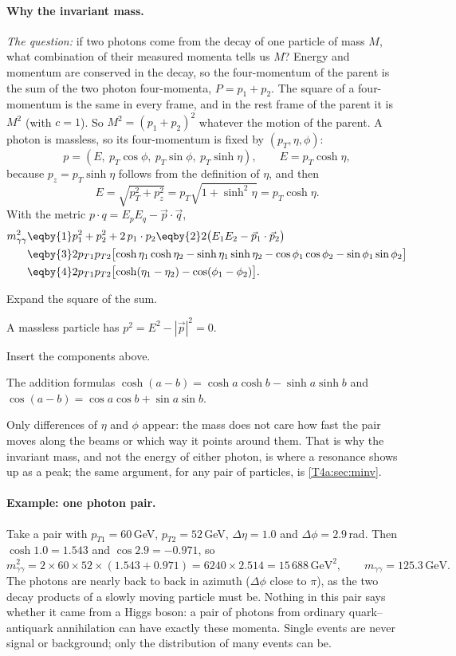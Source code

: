 \paragraph{Why the invariant mass.}
\emph{The question:} if two photons come from the decay of one particle of mass $M$, what
combination of their measured momenta tells us $M$? Energy and momentum are conserved in
the decay, so the four-momentum of the parent is the sum of the two photon four-momenta,
$P=p_1+p_2$. The square of a four-momentum is the same in every frame, and in the rest
frame of the parent it is $M^2$ (with $c=1$). So $M^2=(p_1+p_2)^2$ whatever the motion of
the parent. A photon is massless, so its four-momentum is fixed by $(p_T,\eta,\phi)$:
\[
  p=(E,\ p_T\cos\phi,\ p_T\sin\phi,\ p_T\sinh\eta),\qquad E=p_T\cosh\eta,
\]
because $p_z=p_T\sinh\eta$ follows from the definition of $\eta$, and then
\[
  E=\sqrt{p_T^2+p_z^2}=p_T\sqrt{1+\sinh^2\eta}=p_T\cosh\eta .
\]
With the metric $p\cdot q=E_pE_q-\vec p\cdot\vec q$,
\begin{align}
  m_{\gamma\gamma}^2
  &\eqby{1} p_1^2+p_2^2+2\,p_1\cdot p_2
   \eqby{2} 2\bigl(E_1E_2-\vec p_1\cdot\vec p_2\bigr)
  \nonumber\\
  &\eqby{3} 2p_{T1}p_{T2}\bigl[\cosh\eta_1\cosh\eta_2-\sinh\eta_1\sinh\eta_2
           -\cos\phi_1\cos\phi_2-\sin\phi_1\sin\phi_2\bigr]
  \nonumber\\
  &\eqby{4} 2p_{T1}p_{T2}\bigl[\cosh(\eta_1-\eta_2)-\cos(\phi_1-\phi_2)\bigr].
  \label{13d:eq:mgg}
\end{align}
\begin{explain}
  \item Expand the square of the sum.
  \item A massless particle has $p^2=E^2-|\vec p|^2=0$.
  \item Insert the components above.
  \item The addition formulas $\cosh(a-b)=\cosh a\cosh b-\sinh a\sinh b$ and
        $\cos(a-b)=\cos a\cos b+\sin a\sin b$.
\end{explain}
Only differences of $\eta$ and $\phi$ appear: the mass does not care how fast the pair
moves along the beams or which way it points around them. That is why the invariant mass,
and not the energy of either photon, is where a resonance shows up as a peak; the
same argument, for any pair of particles, is \cref{T4a:sec:minv}.

\paragraph{Example: one photon pair.}
Take a pair with $p_{T1}=60\,$GeV, $p_{T2}=52\,$GeV, $\Delta\eta=1.0$ and
$\Delta\phi=2.9\,$rad. Then $\cosh1.0=1.543$ and $\cos2.9=-0.971$, so
\[
  m_{\gamma\gamma}^2=2\times60\times52\times(1.543+0.971)=6240\times2.514=15\,688\,\mathrm{GeV}^2,
  \qquad m_{\gamma\gamma}=125.3\,\mathrm{GeV}.
\]
The photons are nearly back to back in azimuth ($\Delta\phi$ close to $\pi$), as the two
decay products of a slowly moving particle must be. Nothing in this pair says whether it
came from a Higgs boson: a pair of photons from ordinary quark--antiquark annihilation can
have exactly these momenta. Single events are never signal or background; only the
distribution of many events can be.

